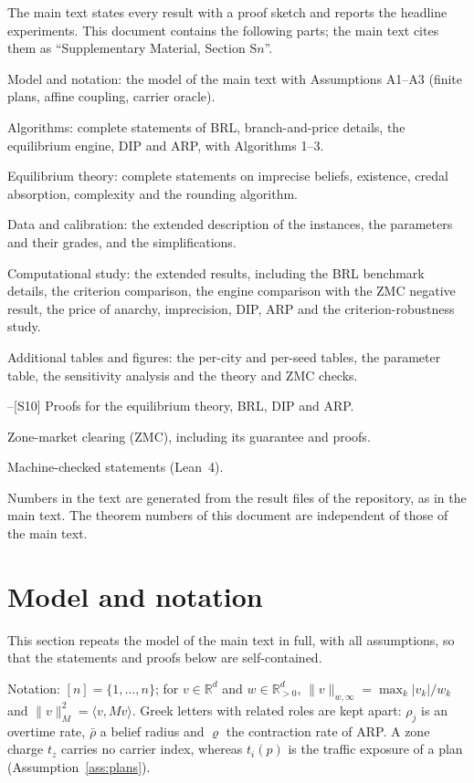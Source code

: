 \documentclass[preprint,11pt]{elsarticle}
\theoremstyle{definition}
\theoremstyle{remark}
\newcommand{\R}{\mathbb{R}}
\newcommand{\ip}[2]{\langle #1,#2\rangle}
\begin{document}
The main text states every result with a proof sketch and reports the headline experiments. This document contains the following parts; the main text cites them as ``Supplementary Material, Section S$n$''.
\begin{description}[itemsep=0pt,leftmargin=*]
\item[S1] Model and notation: the model of the main text with Assumptions A1--A3 (finite plans, affine coupling, carrier oracle).
\item[S2] Algorithms: complete statements of BRL, branch-and-price details, the equilibrium engine, DIP and ARP, with Algorithms 1--3.
\item[S3] Equilibrium theory: complete statements on imprecise beliefs, existence, credal absorption, complexity and the rounding algorithm.
\item[S4] Data and calibration: the extended description of the instances, the parameters and their grades, and the simplifications.
\item[S5] Computational study: the extended results, including the BRL benchmark details, the criterion comparison, the engine comparison with the ZMC negative result, the price of anarchy, imprecision, DIP, ARP and the criterion-robustness study.
\item[S6] Additional tables and figures: the per-city and per-seed tables, the parameter table, the sensitivity analysis and the theory and ZMC checks.
\item[S7]--[S10] Proofs for the equilibrium theory, BRL, DIP and ARP.
\item[S11] Zone-market clearing (ZMC), including its guarantee and proofs.
\item[S12] Machine-checked statements (Lean~4).
\end{description}
Numbers in the text are generated from the result files of the repository, as in the main text. The theorem numbers of this document are independent of those of the main text.

\section{Model and notation}\label{sec:model}

This section repeats the model of the main text in full, with all assumptions, so that the statements and proofs below are self-contained.

Notation: $[n]=\{1,\dots,n\}$; for $v\in\R^d$ and $w\in\R^d_{>0}$, $\|v\|_{w,\infty}=\max_k|v_k|/w_k$ and $\|v\|_M^2=\ip{v}{Mv}$. Greek letters with related roles are kept apart: $\rho_j$ is an overtime rate, $\bar\rho$ a belief radius and $\varrho$ the contraction rate of ARP. A zone charge $t_z$ carries no carrier index, whereas $t_i(p)$ is the traffic exposure of a plan (Assumption~\ref{ass:plans}).
\end{document}
